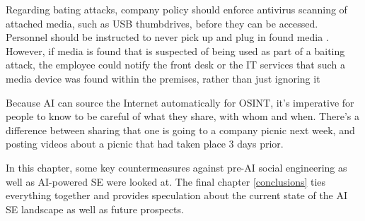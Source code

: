 Regarding bating attacks, company policy should enforce antivirus scanning of attached media, such as USB thumbdrives, before they can be accessed. Personnel should be instructed to never pick up and plug in found media \citep{salahdine_social_2019}. However, if media is found that is suspected of being used as part of a baiting attack, the employee could notify the front desk or the IT services that such a media device was found within the premises, rather than just ignoring it 

Because AI can source the Internet automatically for OSINT, it's imperative for people to know to be careful of what they share, with whom and when. There's a difference between sharing that one is going to a company picnic next week, and posting videos about a picnic that had taken place 3 days prior.



In this chapter, some key countermeasures against pre-AI social engineering as well as AI-powered SE were looked at. The final chapter \ref{conclusions} ties everything together and provides speculation about the current state of the AI SE landscape as well as future prospects.

